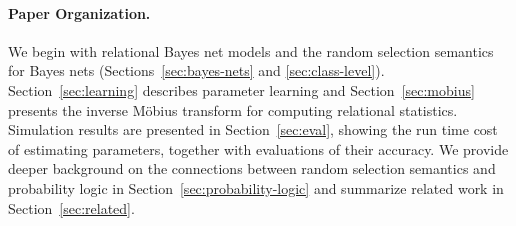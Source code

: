 \documentclass[oribibl]{llncs}
\begin{document}


\paragraph{Paper Organization.} We begin with relational Bayes net models and the random selection semantics for Bayes nets (Sections~\ref{sec:bayes-nets} and \ref{sec:class-level}). Section~\ref{sec:learning} describes parameter learning and Section~\ref{sec:mobius} presents the inverse M\"obius transform for computing relational statistics. Simulation results are presented in Section~\ref{sec:eval}, showing the run time cost of estimating parameters, together with evaluations of their accuracy.
We provide deeper background on the connections between random selection semantics and probability logic in Section~\ref{sec:probability-logic} and
summarize related work in Section~\ref{sec:related}.
%
%
\end{document}
